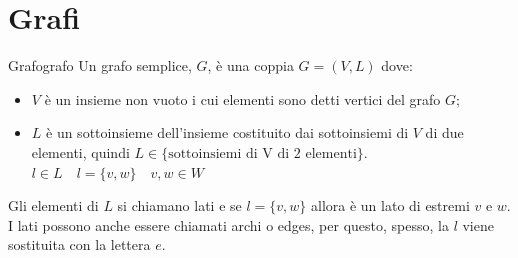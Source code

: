 \documentclass[12pt, letterpaper]{report}
\newcounter{definition}
\newcommand{\nmu}{}
\begin{document}
   	\chapter{Grafi}
   	\begin{definition}{\nmu Grafo}{grafo}
   		Un grafo semplice, $G$, è una coppia $G=(V,L)$ dove:
   		\begin{itemize}
   			\item $V$ è un insieme non vuoto i cui elementi sono detti vertici del grafo $G$;
   			\item $L$ è un sottoinsieme dell'insieme costituito dai sottoinsiemi di $V$ di due elementi, quindi $L \in \{\text{sottoinsiemi di V di 2 elementi}\}$. \\
   			$l \in L \quad l = \{v, w\} \quad v,w \in W$
   		\end{itemize}
   		Gli elementi di $L$ si chiamano lati e se $l = \{v, w\}$ allora è un lato di estremi $v$ e $w$. I lati possono anche essere chiamati archi o edges, per questo, spesso, la $l$ viene sostituita con la lettera $e$.
   	\end{definition}
\end{document}
